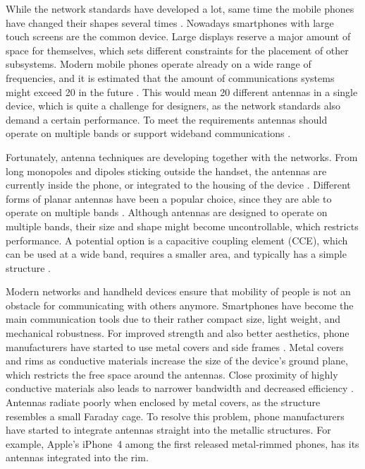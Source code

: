 While the network standards have developed a lot, same time the mobile phones have changed their shapes several times \cite{anguera2}. Nowadays smartphones with large touch screens are the common device. Large displays reserve a major amount of space for themselves, which sets different constraints for the placement of other subsystems. Modern mobile phones operate already on a wide range of frequencies, and it is estimated that the amount of communications systems might exceed 20 in the future \cite{20ant}. This would mean 20 different antennas in a single device, which is quite a challenge for designers, as the network standards also demand a certain performance. To meet the requirements antennas should operate on multiple bands or support wideband communications \cite{lehtovuori_wideband_match}.

Fortunately, antenna techniques are developing together with the networks. From long monopoles and dipoles sticking outside the handset, the antennas are currently inside the phone, or integrated to the housing of the device \cite{saunders,molisch}. Different forms of planar antennas have been a popular choice, since they are able to operate on multiple bands \cite{anguera}. Although antennas are designed to operate on multiple bands, their size and shape might become uncontrollable, which restricts performance. A potential option is a capacitive coupling element (CCE), which can be used at a wide band, requires a smaller area, and typically has a simple structure \cite{valkonen_cce2}.

Modern networks and handheld devices ensure that mobility of people is not an obstacle for communicating with others anymore. Smartphones have become the main communication tools due to their rather compact size, light weight, and mechanical robustness. For improved strength and also better aesthetics, phone manufacturers have started to use metal covers and side frames \cite{rowell}. Metal covers and rims as conductive materials increase the size of the device's ground plane, which restricts the free space around the antennas. Close proximity of highly conductive materials also leads to narrower bandwidth and decreased efficiency \cite{rowell}. Antennas radiate poorly when enclosed by metal covers, as the structure resembles a small Faraday cage. To resolve this problem, phone manufacturers have started to integrate antennas straight into the metallic structures. For example, Apple's iPhone~4 among the first released metal-rimmed phones, has its antennas integrated into the rim. 

